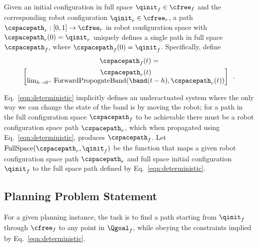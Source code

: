 \begin{assumption}
\label{ass:deterministic}
    Given an initial configuration in full space $\qinit_f \in \cfree_f$ and the corresponding robot configuration $\qinit_r \in \cfree_r$, a path $\cspacepath_r : [0, 1] \rightarrow \cfree_r$ in robot configuration space with $\cspacepath_r(0) = \qinit_r$ uniquely defines a single path in full space $\cspacepath_f$, where $\cspacepath_f(0) = \qinit_f$.  Specifically, define
    \begin{multline}
        \cspacepath_f(t) =\\ \begin{bmatrix} \cspacepath_r(t) \\ 
                \lim_{h \rightarrow 0^-} \textup{ForwardPropogateBand}(\band(t-h), \cspacepath_r(t)) \end{bmatrix} \enspace .
        \label{eqn:deterministic}
    \end{multline}
\end{assumption}

Eq.~\eqref{eqn:deterministic} implicitly defines an underactuated system where the only way we can change the state of the band is by moving the robot; for a path in the full configuration space $\cspacepath_f$ to be achievable there must be a robot configuration space path $\cspacepath_r$, which when propagated using Eq.~\eqref{eqn:deterministic}, produces $\cspacepath_f$. Let $\textrm{FullSpace}(\cspacepath_r, \qinit_f)$ be the function that maps a given robot configuration space path $\cspacepath_r$ and full space initial configuration $\qinit_f$ to the full space path defined by Eq.~\eqref{eqn:deterministic}.




\subsection{Planning Problem Statement}

For a given planning instance, the task is to find a path starting from $\qinit_f$ through $\cfree_f$ to any point in $\Qgoal_f$, while obeying the constraints implied by Eq.~\eqref{eqn:deterministic}.

